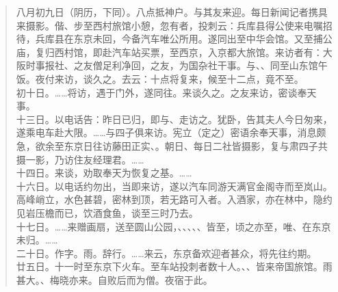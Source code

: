 \begin{quote}
	八月初九日（阴历，下同）。八点抵神户。与其友来迎。每日新闻记者携具来摄影。偕、步至西村旅馆小憩，忽有者，投刺云：兵库县得公使来电嘱招待，兵库县在东京未回，今备汽车唯公所用。遂同出至中华会馆。又至捕公庙，复归西村馆，即赴汽车站买票，至西京，入京都大旅馆。来访者有：大阪时事报社、之友僧足利净回，之友，为国杂社干事。与、、同至山东馆午饭。夜付来访，谈久之。去云：十点将复来，候至十二点，竟不至。\\

初十日。……将访，遇于门外，遂同往。来谈久之。之友来访，密谈奉天事。\\

十三日。以电话告：昨日已归，即与、走访之。犹卧，告其夫人今日匆来，遂乘电车赴大限。……与四子俱来访。宪立（定之）密语余奉天事，消息颇急，欲余至东京日往访藤田正实、。朝日、每日二社皆摄影，复与肃四子共摄一影，乃访住友经理君。……\\

十四日。来谈，劝取奉天为恢复之基。……\\

十六日。以电话约勿出，当即来访，遂以汽车同游天满官金阁寺而至岚山。高峰峭立，水色甚碧，密林到顶，若无路可入者。入酒家，亦在林中，隐约见岩压檐而已，饮酒食鱼，谈至三时乃去。\\

十七日。……来赠画扇，送至圆山公园，、、、、、皆至，顷之亦至，唯、在东京未归。……\\

二十日。作字。雨。辞行。……来云，东京备欢迎者甚众，将先往约期。\\

廿五日。十一时至东京下火车。至车站投刺者数十人。、、皆来帝国旅馆。雨甚大。、梅晓亦来。自败后而为僧。夜宿于此。\\


\end{quote}
